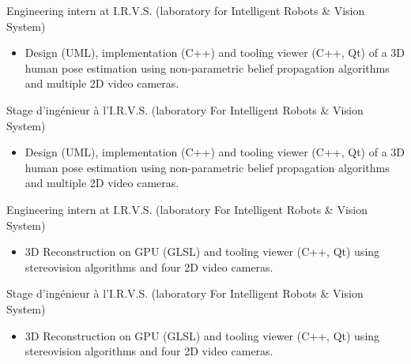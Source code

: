 \documentclass{article}
\begin{document}
\begin{llist}
 {
Engineering intern at I.R.V.S. (laboratory for Intelligent Robots \& Vision System)
\vspace{-0.33cm}
\begin{itemize}
	\item Design (UML), implementation (C++) and tooling viewer (C++, Qt) of a
		3D human pose estimation using non-parametric belief propagation
		algorithms and multiple 2D video cameras.
\end{itemize}
} {
Stage d'ing\'{e}nieur \`{a} l'I.R.V.S. (laboratory For Intelligent Robots \& Vision System)
\vspace{-0.33cm}
\begin{itemize}
	\item Design (UML), implementation (C++) and tooling viewer (C++, Qt) of a
		3D human pose estimation using non-parametric belief propagation
		algorithms and multiple 2D video cameras.
\end{itemize}
}

 {
Engineering intern at I.R.V.S. (laboratory For Intelligent Robots \& Vision System)
\vspace{-0.33cm}
\begin{itemize}
	\item 3D Reconstruction on GPU (GLSL) and tooling viewer (C++, Qt) using stereovision algorithms and four 2D video cameras.
\end{itemize}
} {
Stage d'ing\'{e}nieur \`{a} l'I.R.V.S. (laboratory For Intelligent Robots \& Vision System)
\vspace{-0.33cm}
\begin{itemize}
	\item 3D Reconstruction on GPU (GLSL) and tooling viewer (C++, Qt) using stereovision algorithms and four 2D video cameras.
\end{itemize}
}


\end{llist}
\end{document}
